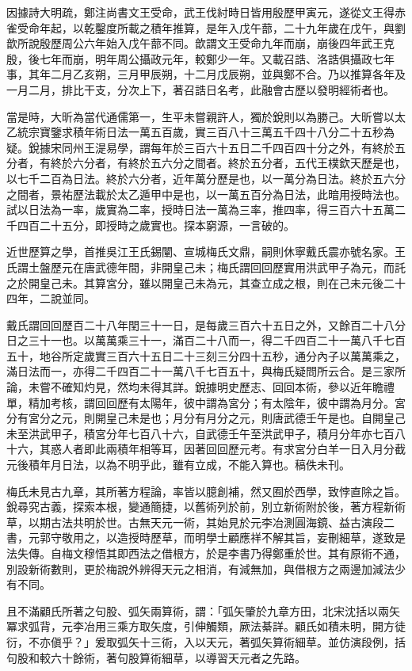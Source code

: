\begin{pinyinscope}
因據詩大明疏，鄭注尚書文王受命，武王伐紂時日皆用殷歷甲寅元，遂從文王得赤雀受命年起，以乾鑿度所載之積年推算，是年入戊午蔀，二十九年歲在戊午，與劉歆所說殷歷周公六年始入戊午蔀不同。歆謂文王受命九年而崩，崩後四年武王克殷，後七年而崩，明年周公攝政元年，較鄭少一年。又載召誥、洛誥俱攝政七年事，其年二月乙亥朔，三月甲辰朔，十二月戊辰朔，並與鄭不合。乃以推算各年及一月二月，排比干支，分次上下，著召誥日名考，此融會古歷以發明經術者也。

當是時，大昕為當代通儒第一，生平未嘗親許人，獨於銳則以為勝己。大昕嘗以太乙統宗寶鑒求積年術日法一萬五百歲，實三百八十三萬五千四十八分二十五秒為疑。銳據宋同州王湜易學，謂每年於三百六十五日二千四百四十分之外，有終於五分者，有終於六分者，有終於五六分之間者。終於五分者，五代王樸欽天歷是也，以七千二百為日法。終於六分者，近年萬分歷是也，以一萬分為日法。終於五六分之間者，景祐歷法載於太乙遁甲中是也，以一萬五百分為日法，此暗用授時法也。試以日法為一率，歲實為二率，授時日法一萬為三率，推四率，得三百六十五萬二千四百二十五分，即授時之歲實也。探本窮源，一言破的。

近世歷算之學，首推吳江王氏錫闡、宣城梅氏文鼎，嗣則休寧戴氏震亦號名家。王氏謂土盤歷元在唐武德年間，非開皇己未；梅氏謂回回歷實用洪武甲子為元，而託之於開皇己未。其算宮分，雖以開皇己未為元，其查立成之根，則在己未元後二十四年，二說並同。

戴氏謂回回歷百二十八年閏三十一日，是每歲三百六十五日之外，又餘百二十八分日之三十一也。以萬萬乘三十一，滿百二十八而一，得二千四百二十一萬八千七百五十，地谷所定歲實三百六十五日二十三刻三分四十五秒，通分內子以萬萬乘之，滿日法而一，亦得二千四百二十一萬八千七百五十，與梅氏疑問所云合。是三家所論，未嘗不確知灼見，然均未得其詳。銳據明史歷志、回回本術，參以近年瞻禮單，精加考核，謂回回歷有太陽年，彼中謂為宮分；有太陰年，彼中謂為月分。宮分有宮分之元，則開皇己未是也；月分有月分之元，則唐武德壬午是也。自開皇己未至洪武甲子，積宮分年七百八十六，自武德壬午至洪武甲子，積月分年亦七百八十六，其惑人者即此兩積年相等耳，因著回回歷元考。有求宮分白羊一日入月分截元後積年月日法，以為不明乎此，雖有立成，不能入算也。稿佚未刊。

梅氏未見古九章，其所著方程論，率皆以臆創補，然又囿於西學，致悖直除之旨。銳尋究古義，探索本根，變通簡捷，以舊術列於前，別立新術附於後，著方程新術草，以期古法共明於世。古無天元一術，其始見於元李冶測圓海鏡、益古演段二書，元郭守敬用之，以造授時歷草，而明學士顧應祥不解其旨，妄刪細草，遂致是法失傳。自梅文穆悟其即西法之借根方，於是李書乃得鄭重於世。其有原術不通，別設新術數則，更於梅說外辨得天元之相消，有減無加，與借根方之兩邊加減法少有不同。

且不滿顧氏所著之句股、弧矢兩算術，謂：「弧矢肇於九章方田，北宋沈括以兩矢冪求弧背，元李冶用三乘方取矢度，引伸觸類，厥法綦詳。顧氏如積未明，開方徒衍，不亦傎乎？」爰取弧矢十三術，入以天元，著弧矢算術細草。並仿演段例，括句股和較六十餘術，著句股算術細草，以導習天元者之先路。


\end{pinyinscope}
